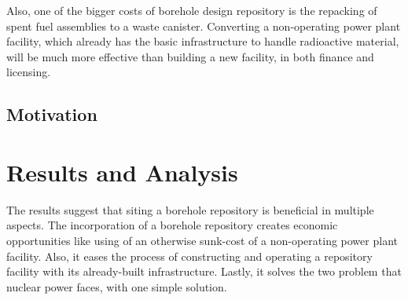 \documentclass{anstrans}
\begin{document}
Also, one of the bigger costs of borehole design repository is the repacking of 
spent fuel assemblies to a waste canister. Converting a non-operating power 
plant facility, which already has the basic infrastructure to handle 
radioactive material, will be much more effective than building a new facility, 
in both finance and licensing. 

\subsection{Motivation}



\section{Results and Analysis}
The results suggest that siting a borehole repository is beneficial in multiple 
aspects. The incorporation of a borehole repository creates economic 
opportunities like using of an otherwise sunk-cost of a non-operating power 
plant facility. Also, it eases the process of constructing and operating a 
repository facility with its already-built infrastructure. Lastly, it solves 
the two problem that nuclear power faces, with one simple solution.
\end{document}
